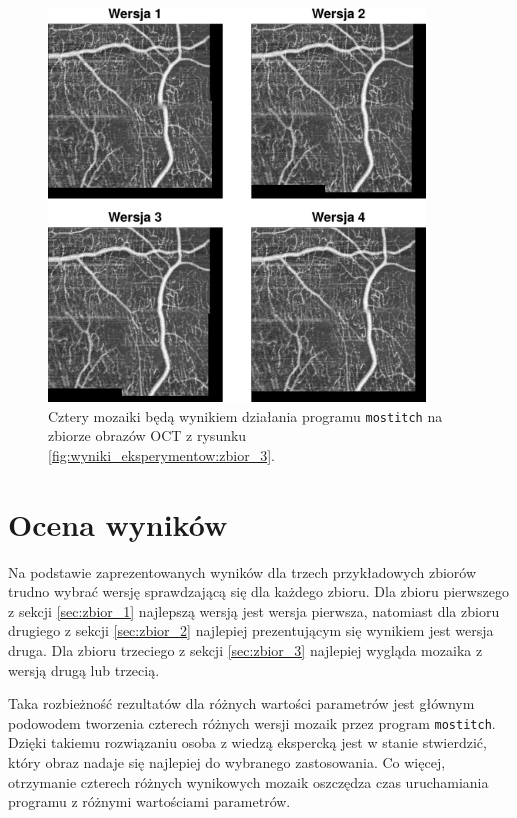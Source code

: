 \begin{figure}[htb]
  \centering
  \includegraphics[width=10cm]{gfx/wynik_zbior_3}
  \caption{Cztery mozaiki będą wynikiem działania programu \texttt{mostitch} na zbiorze obrazów OCT z rysunku \ref{fig:wyniki_eksperymentow:zbior_3}.}
  \label{fig:wyniki_eksperymentow:wynik_zbior_3}
\end{figure}

\section{Ocena wyników}
\label{sec:ocena_wynikow}

Na podstawie zaprezentowanych wyników dla trzech przykładowych zbiorów trudno wybrać wersję sprawdzającą się dla każdego zbioru. Dla zbioru pierwszego z sekcji \ref{sec:zbior_1} najlepszą wersją jest wersja pierwsza, natomiast dla zbioru drugiego z sekcji \ref{sec:zbior_2} najlepiej prezentującym się wynikiem jest wersja druga. Dla zbioru trzeciego z sekcji \ref{sec:zbior_3} najlepiej wygląda mozaika z wersją drugą lub trzecią. 

Taka rozbieżność rezultatów dla różnych wartości parametrów jest głównym podowodem tworzenia czterech różnych wersji mozaik przez program \texttt{mostitch}. Dzięki takiemu rozwiązaniu osoba z wiedzą ekspercką jest w stanie stwierdzić, który obraz nadaje się najlepiej do wybranego zastosowania. Co więcej, otrzymanie czterech różnych wynikowych mozaik oszczędza czas uruchamiania programu z różnymi wartościami parametrów.













